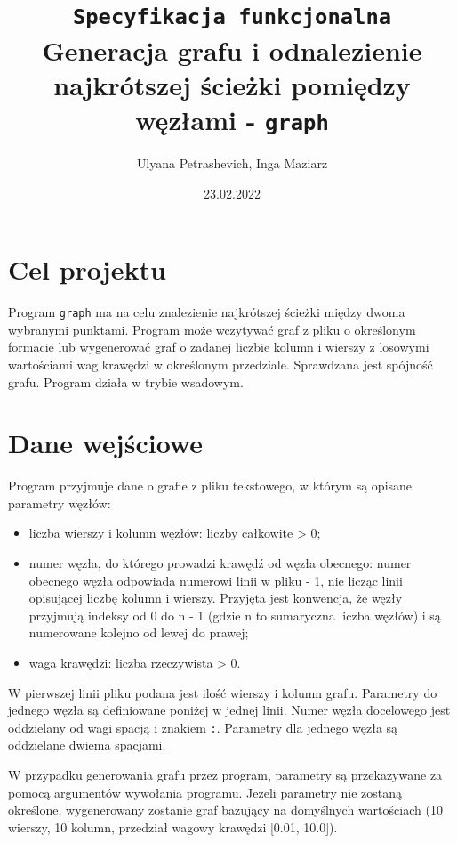 \documentclass[]{article}
\title{\texttt{Specyfikacja funkcjonalna}\\Generacja grafu i odnalezienie najkrótszej ścieżki pomiędzy węzłami - \texttt{graph}}
\author{Ulyana Petrashevich, Inga Maziarz}
\date{23.02.2022}
\begin{document}
\maketitle

\section{Cel projektu}\label{header-n231}

Program \texttt{graph} ma na celu znalezienie najkrótszej ścieżki między dwoma wybranymi punktami. Program może wczytywać graf z pliku o określonym formacie lub wygenerować graf o zadanej liczbie kolumn i wierszy z losowymi wartościami wag krawędzi w określonym przedziale. Sprawdzana jest spójność grafu. Program działa w trybie wsadowym.

\section{Dane wejściowe}\label{header-n233}

Program przyjmuje dane o grafie z pliku tekstowego, w którym są opisane parametry węzłów:

\begin{itemize}
\item
  liczba wierszy i kolumn węzłów: liczby całkowite \textgreater{} 0;
\item
  numer węzła, do którego prowadzi krawędź od węzła obecnego: numer obecnego węzła odpowiada numerowi linii w pliku - 1, nie licząc linii opisującej liczbę kolumn i wierszy. Przyjęta jest konwencja, że węzły przyjmują indeksy od 0 do n - 1 (gdzie n to sumaryczna liczba węzłów) i są numerowane kolejno od lewej do prawej; 
\item
  waga krawędzi: liczba rzeczywista \textgreater{} 0.
\end{itemize}

W pierwszej linii pliku podana jest ilość wierszy i kolumn grafu. Parametry do jednego węzła są definiowane poniżej w jednej linii. Numer węzła docelowego jest oddzielany od wagi spacją i znakiem \texttt{:}. Parametry dla jednego węzła są oddzielane dwiema spacjami.

W przypadku generowania grafu przez program, parametry są przekazywane za pomocą argumentów wywołania programu. Jeżeli parametry nie zostaną określone, wygenerowany zostanie graf bazujący na domyślnych wartościach (10 wierszy, 10 kolumn, przedział wagowy krawędzi [0.01, 10.0]).
\end{document}
